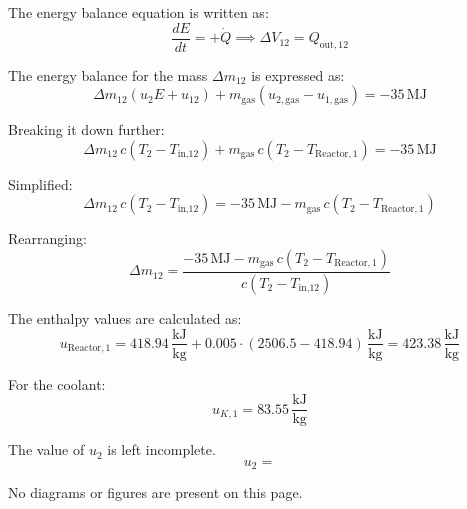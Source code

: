 The energy balance equation is written as:  
\[
\frac{dE}{dt} = + \dot{Q} \implies \Delta V_{12} = Q_{\text{out},12}
\]

The energy balance for the mass \(\Delta m_{12}\) is expressed as:  
\[
\Delta m_{12} \left( u_2 E + u_{12} \right) + m_{\text{gas}} \left( u_{2,\text{gas}} - u_{1,\text{gas}} \right) = -35 \, \text{MJ}
\]

Breaking it down further:  
\[
\Delta m_{12} \, c \left( T_2 - T_{\text{in,12}} \right) + m_{\text{gas}} \, c \left( T_2 - T_{\text{Reactor},1} \right) = -35 \, \text{MJ}
\]

Simplified:  
\[
\Delta m_{12} \, c \left( T_2 - T_{\text{in,12}} \right) = -35 \, \text{MJ} - m_{\text{gas}} \, c \left( T_2 - T_{\text{Reactor},1} \right)
\]

Rearranging:  
\[
\Delta m_{12} = \frac{-35 \, \text{MJ} - m_{\text{gas}} \, c \left( T_2 - T_{\text{Reactor},1} \right)}{c \left( T_2 - T_{\text{in,12}} \right)}
\]

The enthalpy values are calculated as:  
\[
u_{\text{Reactor},1} = 418.94 \, \frac{\text{kJ}}{\text{kg}} + 0.005 \cdot (2506.5 - 418.94) \, \frac{\text{kJ}}{\text{kg}} = 423.38 \, \frac{\text{kJ}}{\text{kg}}
\]

For the coolant:  
\[
u_{K,1} = 83.55 \, \frac{\text{kJ}}{\text{kg}}
\]

The value of \( u_2 \) is left incomplete.  
\[
u_2 =
\]  

No diagrams or figures are present on this page.